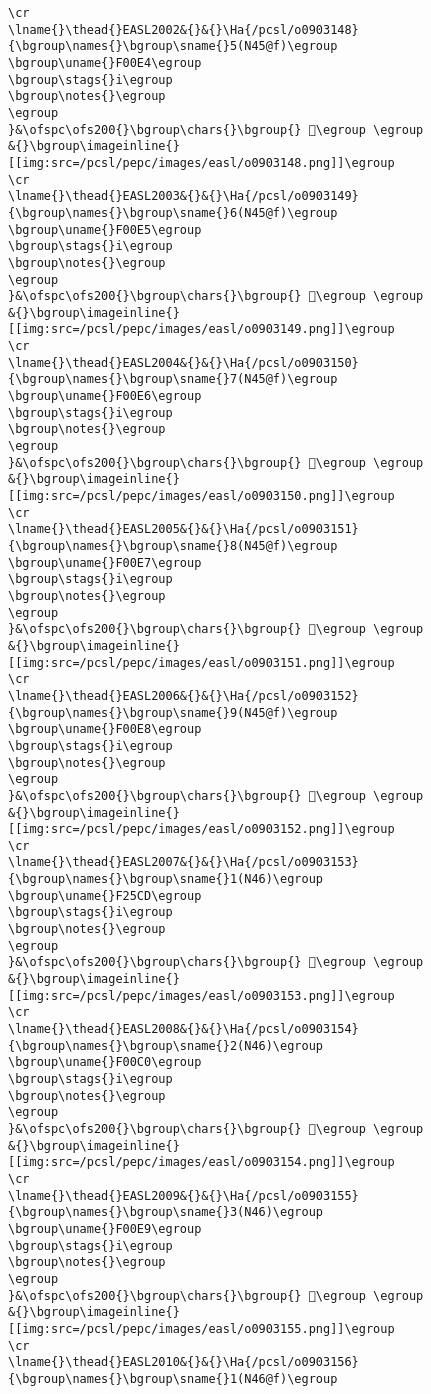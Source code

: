 \begin{verbatim}
\cr
\lname{}\thead{}EASL2002&{}&{}\Ha{/pcsl/o0903148}{\bgroup\names{}\bgroup\sname{}5(N45@f)\egroup
\bgroup\uname{}F00E4\egroup
\bgroup\stags{}i\egroup
\bgroup\notes{}\egroup
\egroup
}&\ofspc\ofs200{}\bgroup\chars{}\bgroup{} 󰃤\egroup \egroup
&{}\bgroup\imageinline{}[[img:src=/pcsl/pepc/images/easl/o0903148.png]]\egroup
\cr
\lname{}\thead{}EASL2003&{}&{}\Ha{/pcsl/o0903149}{\bgroup\names{}\bgroup\sname{}6(N45@f)\egroup
\bgroup\uname{}F00E5\egroup
\bgroup\stags{}i\egroup
\bgroup\notes{}\egroup
\egroup
}&\ofspc\ofs200{}\bgroup\chars{}\bgroup{} 󰃥\egroup \egroup
&{}\bgroup\imageinline{}[[img:src=/pcsl/pepc/images/easl/o0903149.png]]\egroup
\cr
\lname{}\thead{}EASL2004&{}&{}\Ha{/pcsl/o0903150}{\bgroup\names{}\bgroup\sname{}7(N45@f)\egroup
\bgroup\uname{}F00E6\egroup
\bgroup\stags{}i\egroup
\bgroup\notes{}\egroup
\egroup
}&\ofspc\ofs200{}\bgroup\chars{}\bgroup{} 󰃦\egroup \egroup
&{}\bgroup\imageinline{}[[img:src=/pcsl/pepc/images/easl/o0903150.png]]\egroup
\cr
\lname{}\thead{}EASL2005&{}&{}\Ha{/pcsl/o0903151}{\bgroup\names{}\bgroup\sname{}8(N45@f)\egroup
\bgroup\uname{}F00E7\egroup
\bgroup\stags{}i\egroup
\bgroup\notes{}\egroup
\egroup
}&\ofspc\ofs200{}\bgroup\chars{}\bgroup{} 󰃧\egroup \egroup
&{}\bgroup\imageinline{}[[img:src=/pcsl/pepc/images/easl/o0903151.png]]\egroup
\cr
\lname{}\thead{}EASL2006&{}&{}\Ha{/pcsl/o0903152}{\bgroup\names{}\bgroup\sname{}9(N45@f)\egroup
\bgroup\uname{}F00E8\egroup
\bgroup\stags{}i\egroup
\bgroup\notes{}\egroup
\egroup
}&\ofspc\ofs200{}\bgroup\chars{}\bgroup{} 󰃨\egroup \egroup
&{}\bgroup\imageinline{}[[img:src=/pcsl/pepc/images/easl/o0903152.png]]\egroup
\cr
\lname{}\thead{}EASL2007&{}&{}\Ha{/pcsl/o0903153}{\bgroup\names{}\bgroup\sname{}1(N46)\egroup
\bgroup\uname{}F25CD\egroup
\bgroup\stags{}i\egroup
\bgroup\notes{}\egroup
\egroup
}&\ofspc\ofs200{}\bgroup\chars{}\bgroup{} 󲗍\egroup \egroup
&{}\bgroup\imageinline{}[[img:src=/pcsl/pepc/images/easl/o0903153.png]]\egroup
\cr
\lname{}\thead{}EASL2008&{}&{}\Ha{/pcsl/o0903154}{\bgroup\names{}\bgroup\sname{}2(N46)\egroup
\bgroup\uname{}F00C0\egroup
\bgroup\stags{}i\egroup
\bgroup\notes{}\egroup
\egroup
}&\ofspc\ofs200{}\bgroup\chars{}\bgroup{} 󰃀\egroup \egroup
&{}\bgroup\imageinline{}[[img:src=/pcsl/pepc/images/easl/o0903154.png]]\egroup
\cr
\lname{}\thead{}EASL2009&{}&{}\Ha{/pcsl/o0903155}{\bgroup\names{}\bgroup\sname{}3(N46)\egroup
\bgroup\uname{}F00E9\egroup
\bgroup\stags{}i\egroup
\bgroup\notes{}\egroup
\egroup
}&\ofspc\ofs200{}\bgroup\chars{}\bgroup{} 󰃩\egroup \egroup
&{}\bgroup\imageinline{}[[img:src=/pcsl/pepc/images/easl/o0903155.png]]\egroup
\cr
\lname{}\thead{}EASL2010&{}&{}\Ha{/pcsl/o0903156}{\bgroup\names{}\bgroup\sname{}1(N46@f)\egroup

\end{verbatim}
